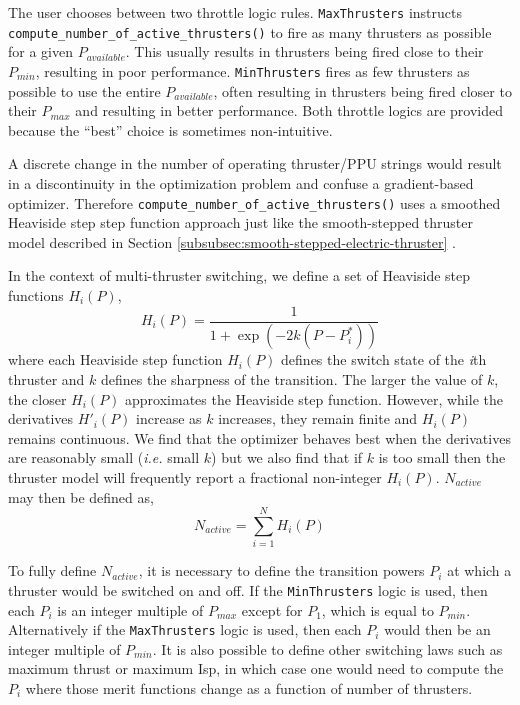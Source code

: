 The user chooses between two throttle logic rules. \texttt{MaxThrusters} instructs \texttt{compute\_number\_of\_active\_thrusters()} to fire as many thrusters as possible for a given $P_{available}$. This usually results in thrusters being fired close to their $P_{min}$, resulting in poor performance. \texttt{MinThrusters} fires as few thrusters as possible to use the entire $P_{available}$, often resulting in thrusters being fired closer to their $P_{max}$ and resulting in better performance. Both throttle logics are provided because the ``best'' choice is sometimes non-intuitive.

A discrete change in the number of operating thruster/\ac{PPU} strings would result in a discontinuity in the optimization problem and confuse a gradient-based optimizer. Therefore \texttt{compute\_number\_of\_active\_thrusters()} uses a smoothed Heaviside step step function approach just like the smooth-stepped thruster model described in Section \ref{subsubsec:smooth-stepped-electric-thruster} \cite{EMTG_OperationalConstraints}.

In the context of multi-thruster switching, we define a set of Heaviside step functions $H_i\left(P\right)$,
\begin{equation}
H_i\left(P\right) = \frac{1}{1 + \exp{\left(-2 k \left(P - P_i^*\right)\right)}}
\end{equation}
%
where each Heaviside step function $H_i\left(P\right)$ defines the switch state of the \textit{i}th thruster and $k$ defines the sharpness of the transition. The larger the value of $k$, the closer $H_i\left(P\right)$ approximates the Heaviside step function. However, while the derivatives $H'_i\left(P\right)$ increase as $k$ increases, they remain finite and $H_i\left(P\right)$ remains continuous. We find that the optimizer behaves best when the derivatives are reasonably small (\textit{i.e.} small $k$) but we also find that if $k$ is too small then the thruster model will frequently report a fractional non-integer $H_i\left(P\right)$. $N_{active}$ may then be defined as,
%
\begin{equation}
N_{active} = \sum_{i=1}^{N} H_i\left(P\right)
\label{eq:computation_of_N_active}
\end{equation}

To fully define $N_{active}$, it is necessary to define the transition powers $P_i$ at which a thruster would be switched on and off. If the \texttt{MinThrusters} logic is used, then each $P_i$ is an integer multiple of $P_{max}$ except for $P_1$, which is equal to $P_{min}$. Alternatively if the \texttt{MaxThrusters} logic is used, then each $P_i$ would then be an integer multiple of $P_{min}$. It is also possible to define other switching laws such as maximum thrust or maximum \ac{Isp}, in which case one would need to compute the $P_i$ where those merit functions change as a function of number of thrusters.

